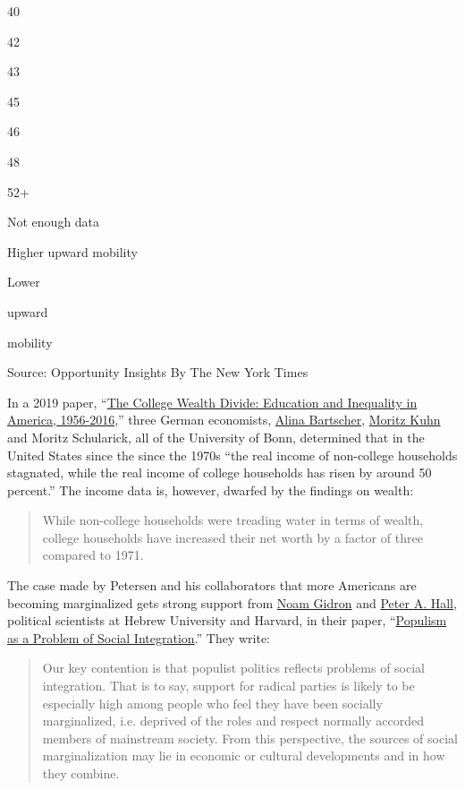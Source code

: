 40

42

43

45

46

48

52+

Not enough data

Higher upward mobility

Lower

upward

mobility

Source: Opportunity Insights \textbar{} By The New York Times

In a 2019 paper,
``\href{https://papers.ssrn.com/sol3/papers.cfm?abstract_id=3421153}{The
College Wealth Divide: Education and Inequality in America,
1956-2016},'' three German economists,
\href{https://www.bgse.uni-bonn.de/en/people/student-directory/2017/alina-bartscher}{Alina
Bartscher},
\href{https://www.bgse.uni-bonn.de/en/people/faculty-directory/moritz-kuhn}{Moritz
Kuhn} and Moritz Schularick, all of the University of Bonn, determined
that in the United States since the since the 1970s ``the real income of
non-college households stagnated, while the real income of college
households has risen by around 50 percent.'' The income data is,
however, dwarfed by the findings on wealth:

\begin{quote}
While non-college households were treading water in terms of wealth,
college households have increased their net worth by a factor of three
compared to 1971.
\end{quote}

The case made by Petersen and his collaborators that more Americans are
becoming marginalized gets strong support from
\href{https://en.politics.huji.ac.il/people/noam-gidron}{Noam Gidron}
and \href{https://scholar.harvard.edu/hall/home}{Peter A. Hall},
political scientists at Hebrew University and Harvard, in their paper,
``\href{https://scholar.harvard.edu/files/hall/files/gidronhallmay2018.pdf}{Populism
as a Problem of Social Integration}.'' They write:

\begin{quote}
Our key contention is that populist politics reflects problems of social
integration. That is to say, support for radical parties is likely to be
especially high among people who feel they have been socially
marginalized, i.e. deprived of the roles and respect normally accorded
members of mainstream society. From this perspective, the sources of
social marginalization may lie in economic or cultural developments and
in how they combine.
\end{quote}

